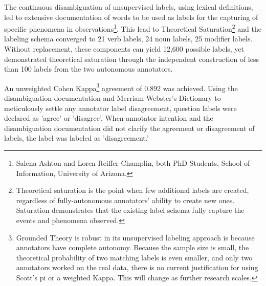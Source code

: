 The continuous disambiguation of unsupervised labels, using lexical definitions, led to extensive
documentation of words to be used as labels for the capturing of specific phenomena in observations\footnote{Salena Ashton and Loren Reiffer-Champlin, both PhD Students, School of Information, University of Arizona.}. This lead to Theoretical Saturation\footnote{Theoretical saturation is the point when few additional labels are created, regardless of fully-autonomous annotators' ability to create new ones. Saturation demonstrates that the existing label schema fully capture the events and phenomena observed.} and the labeling schema converged to 21 verb
labels, 24 noun labels, 25 modifier labels. Without replacement, these
components can yield 12,600 possible labels, yet demonstrated theoretical
saturation through the independent construction of less than 100 labels from the 
two autonomous annotators.

An unweighted Cohen Kappa\footnote{Grounded Theory is robust in its
unsupervised labeling approach is because annotators have complete autonomy.
Because the sample size is small, the theoretical probability of two matching
labels is even smaller, and only two annotators worked on the real data, there
is no current justification for using Scott's pi or a weighted Kappa. This will
change as further research scales.} agreement of 0.892 was achieved. Using the
disambiguation documentation and Merriam-Webster's Dictionary to meticulously
settle any annotator label disagreement, question labels were declared as
'agree' or 'disagree'. When annotator intention and the disambiguation
documentation did not clarify the agreement or disagreement of labels, the label was labeled as 'disagreement.'

